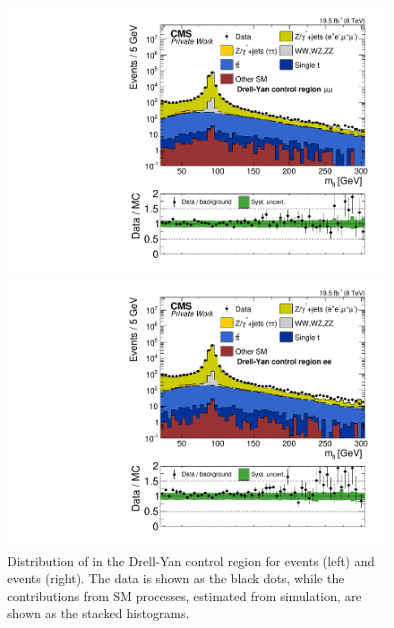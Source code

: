 \begin{figure}[htbp]
\centering
\begin{minipage}[t]{0.49\textwidth}
  \includegraphics[width=\textwidth]{plots/BG/rmue/DrellYanControl_Mll_Full2012_MuMu_TopReweighted.pdf}
\end{minipage}
\begin{minipage}[t]{0.49\textwidth}
\includegraphics[width=\textwidth]{plots/BG/rmue/DrellYanControl_Mll_Full2012_EE_TopReweighted.pdf}
\end{minipage}
\caption{Distribution of \mll in the Drell-Yan control region for \MM events (left) and \EE events (right). The data is shown as the black dots, while the contributions from SM processes, estimated from simulation, are shown as the stacked histograms.}
\label{fig:rmueMll}
\end{figure} 
